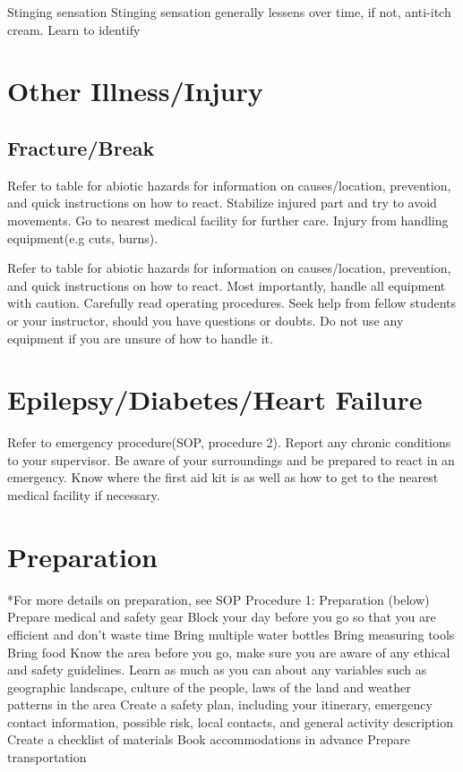 \documentclass[12pt]{../SOP2}
\begin{document}
Stinging sensation
Stinging sensation generally lessens over time, if not, anti-itch cream.
Learn to identify


\section{Other Illness/Injury}

\subsection{Fracture/Break}

\NP Refer to table for abiotic hazards for information on causes/location, prevention, and quick instructions on how to react. Stabilize injured part and try to avoid movements. Go to nearest medical facility for further care.
Injury from handling equipment(e.g cuts, burns).


\NP Refer to table for abiotic hazards for information on causes/location, prevention, and quick instructions on how to react. Most importantly, handle all equipment with caution. Carefully read operating procedures. Seek help from fellow students or your instructor, should you have questions or doubts. Do not use any equipment if you are unsure of how to handle it. 

\section{Epilepsy/Diabetes/Heart Failure}

Refer to emergency procedure(SOP, procedure 2).
Report any chronic conditions to your supervisor.
Be aware of your surroundings and be prepared to react in an emergency.
Know where the first aid kit is as well as how to get to the nearest medical facility if necessary. 


\section{Preparation}

*For more details on preparation, see SOP Procedure 1: Preparation (below)
Prepare medical and safety gear 
Block your day before you go so that you are efficient and don't waste time
Bring multiple water bottles
Bring measuring tools
Bring food
Know the area before you go, make sure you are aware of any ethical and safety guidelines. Learn as much as you can about any variables such as geographic landscape, culture of the people, laws of the land and weather patterns in the area
Create a safety plan, including your itinerary, emergency contact information, possible risk, local contacts, and general activity description 
Create a checklist of materials 
Book accommodations in advance
Prepare transportation
\end{document}
